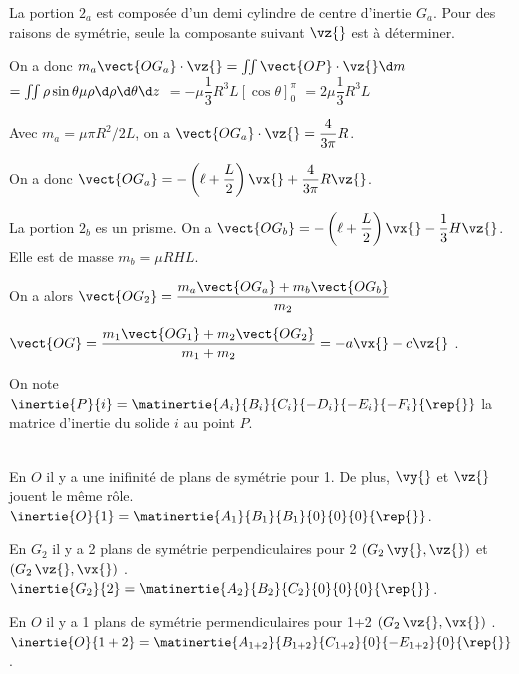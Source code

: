 \ifprof
\begin{corrige}
La portion $2_a$ est composée d'un demi cylindre de centre d'inertie $G_a$. Pour des raisons de symétrie, seule la composante suivant $\vz{}$ est à déterminer.

On a donc $m_a \vect{OG_a}\cdot \vz{} = \iint \vect{OP}\cdot \vz{} \d m$ 
$ =\iint \rho \sin \theta \mu      \rho \d\rho \d \theta \d z$  
$ = - \mu    \dfrac{1}{3}R^3  L \left[ \cos \theta \right]_{0}^{\pi}  $  
$ =  2 \mu    \dfrac{1}{3}R^3  L $

Avec $m_a = \mu \pi R^2/2L$, on a $ \vect{OG_a}\cdot \vz{} = \dfrac{4}{3\pi}R  $.

On a donc $\vect{OG_a}=-\left(\ell+\dfrac{L}{2}\right) \vx{}+\dfrac{4}{3\pi}R \vz{}$.

La portion $2_b$ es un prisme. On a $\vect{OG_b}=-\left(\ell+\dfrac{L}{2}\right) \vx{}-\dfrac{1}{3}H \vz{}$. Elle est de masse $m_b = \mu RHL$.


On a alors $\vect{OG_2} = \dfrac{m_a \vect{OG_a} + m_b \vect{OG_b} }{m_2}$
\end{corrige}
\else
\fi



\ifprof
\begin{corrige}
$\vect{OG} = \dfrac{m_1 \vect{OG_1} + m_2 \vect{OG_2} }{m_1+m_2} =-a\vx{}-c\vz{}$ .
\end{corrige}
\else
\fi


On note $\inertie{P}{i} = \matinertie{A_i}{B_i}{C_i}{-D_i}{-E_i}{-F_i}{\rep{}}$  la matrice d'inertie du solide $i$ au point $P$.

\ifprof
\begin{corrige}~\\

En $O$ il y a une inifinité de plans de symétrie pour 1. De plus, $\vy{}$ et $\vz{}$ jouent le même rôle. 
$\inertie{O}{1} = \matinertie{A_1}{B_1}{B_1}{0}{0}{0}{\rep{}}$.

En $G_2$ il y a 2 plans de symétrie perpendiculaires pour 2 $(G_2\,\vy{},\vz{})$ et $(G_2\,\vz{},\vx{})$ .
$\inertie{G_2}{2} = \matinertie{A_2}{B_2}{C_2}{0}{0}{0}{\rep{}}$.


En $O$ il y a 1 plans de symétrie permendiculaires pour 1+2  $(G_2\,\vz{},\vx{})$ .
$\inertie{O}{1+2} = \matinertie{A_{1+2}}{B_{1+2}}{C_{1+2}}{0}{-E_{1+2}}{0}{\rep{}}$.

\end{corrige}
\else
\fi


